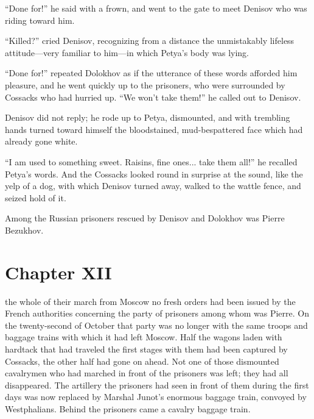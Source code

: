 ``Done for!'' he said with a frown, and went to the gate to meet
Denisov who was riding toward him.

``Killed?'' cried Denisov, recognizing from a distance the
unmistakably lifeless attitude---very familiar to him---in which
Petya's body was lying.

``Done for!'' repeated Dolokhov as if the utterance of these
words afforded him pleasure, and he went quickly up to the
prisoners, who were surrounded by Cossacks who had hurried
up. ``We won't take them!'' he called out to Denisov.

Denisov did not reply; he rode up to Petya, dismounted, and with
trembling hands turned toward himself the bloodstained,
mud-be\-spat\-tered face which had already gone white.

``I am used to something sweet. Raisins, fine ones... take them
all!'' he recalled Petya's words. And the Cossacks looked round
in surprise at the sound, like the yelp of a dog, with which
Denisov turned away, walked to the wattle fence, and seized hold
of it.

Among the Russian prisoners rescued by Denisov and Dolokhov was
Pierre Bezukhov.


\chapter*{Chapter XII} \ifaudio {}
\fi

 the whole of their march from Moscow no fresh orders had
been issued by the French authorities concerning the party of
prisoners among whom was Pierre. On the twenty-second of October
that party was no longer with the same troops and baggage trains
with which it had left Moscow. Half the wagons laden with
hardtack that had traveled the first stages with them had been
captured by Cossacks, the other half had gone on ahead. Not one
of those dismounted cavalrymen who had marched in front of the
prisoners was left; they had all disappeared. The artillery the
prisoners had seen in front of them during the first days was now
replaced by Marshal Junot's enormous baggage train, convoyed by
Westphalians. Behind the prisoners came a cavalry baggage train.

